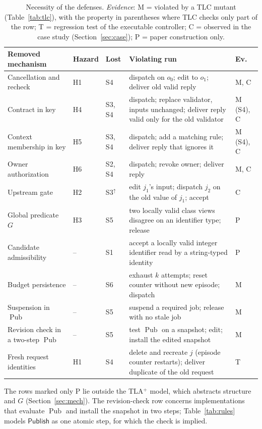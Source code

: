 \documentclass[pdflatex,sn-mathphys-num]{sn-jnl}
\theoremstyle{thmstyleone}%
\theoremstyle{thmstyletwo}%
\theoremstyle{thmstylethree}%
\newcommand{\Pub}{\operatorname{Pub}}
\newcommand{\tla}{TLA$^+$}
\begin{document}
\begin{table}[!ht]
\caption{Necessity of the defenses. \emph{Evidence}: M = violated by a TLC mutant (Table~\ref{tab:tlc}), with the property in parentheses where TLC checks only part of the row; T = regression test of the executable controller; C = observed in the case study (Section~\ref{sec:case}); P = paper construction only.}\label{tab:necessity}
\footnotesize\setlength{\tabcolsep}{3pt}
\begin{tabular}{@{}P{30mm}lP{16mm}P{55mm}l@{}}\toprule
Removed mechanism & Hazard & Lost & Violating run & Ev.\\\midrule
Cancellation and recheck & H1 & S4 & dispatch on $o_0$; edit to $o_1$; deliver old valid reply & M, C\\
Contract in key & H4 & S3, S4 & dispatch; replace validator, inputs unchanged; deliver reply valid only for the old validator & M (S4), C\\
Context membership in key & H5 & S3, S4 & dispatch; add a matching rule; deliver reply that ignores it & M (S4), C\\
Owner authorization & H6 & S2, S4 & dispatch; revoke owner; deliver reply & M, C\\
Upstream gate & H2 & S3$^{\uparrow}$ & edit $j_1$'s input; dispatch $j_2$ on the old value of $j_1$; accept & C\\
Global predicate $G$ & H3 & S5 & two locally valid class views disagree on an identifier type; release & P\\
Candidate admissibility & -- & S1 & accept a locally valid integer identifier read by a string-typed identity & P\\
Budget persistence & -- & S6 & exhaust $k$ attempts; reset counter without new episode; dispatch & M\\
Suspension in $\Pub$ & -- & S5 & suspend a required job; release with no stale job & M\\
Revision check in a two-step $\Pub$ & -- & S5 & test $\Pub$ on a snapshot; edit; install the edited snapshot & M\\
Fresh request identities & H1 & S4 & delete and recreate $j$ (episode counter restarts); deliver duplicate of the old request & T\\\bottomrule
\end{tabular}
\end{table}
The rows marked only P lie outside the \tla{} model, which abstracts structure and $G$ (Section~\ref{sec:mech}). The revision-check row concerns implementations that evaluate $\Pub$ and install the snapshot in two steps; Table~\ref{tab:rules} models $\mathsf{Publish}$ as one atomic step, for which the check is implied.
\end{document}
